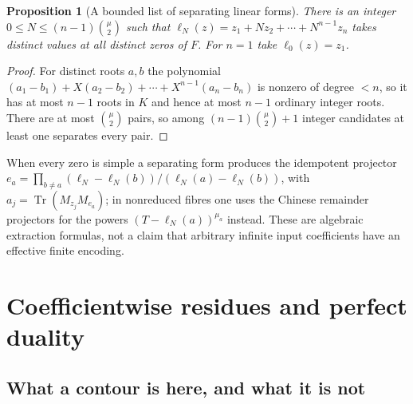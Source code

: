 \documentclass[11pt,letterpaper]{article}
\newtheorem{proposition}[theorem]{Proposition}
\theoremstyle{definition}
\theoremstyle{remark}
\DeclareMathOperator{\Tr}{Tr}
\numberwithin{equation}{section}
\begin{document}
\begin{proposition}[A bounded list of separating linear forms]
\label{finite:prop:separation}
There is an integer $0\leq N\leq(n-1)\binom{\mu}{2}$ such that $\ell_N(z)=z_1+Nz_2+\cdots+N^{n-1}z_n$ takes distinct values at all distinct zeros of $F$. For $n=1$ take $\ell_0(z)=z_1$.
\end{proposition}

\begin{proof}
For distinct roots $a,b$ the polynomial $(a_1-b_1)+X(a_2-b_2)+\cdots+X^{n-1}(a_n-b_n)$ is nonzero of degree $<n$, so it has at most $n-1$ roots in $K$ and hence at most $n-1$ ordinary integer roots. There are at most $\binom\mu2$ pairs, so among $(n-1)\binom\mu2+1$ integer candidates at least one separates every pair.
\end{proof}

When every zero is simple a separating form produces the idempotent projector $e_a=\prod_{b\neq a}(\ell_N-\ell_N(b))/(\ell_N(a)-\ell_N(b))$, with $a_j=\Tr(M_{z_j}M_{e_a})$; in nonreduced fibres one uses the Chinese remainder projectors for the powers $(T-\ell_N(a))^{\mu_a}$ instead. These are algebraic extraction formulas, not a claim that arbitrary infinite input coefficients have an effective finite encoding.

\section{Coefficientwise residues and perfect duality}
\label{finite:sec:residues}

\subsection{What a contour is here, and what it is not}
\label{finite:sec:contour}
\end{document}
